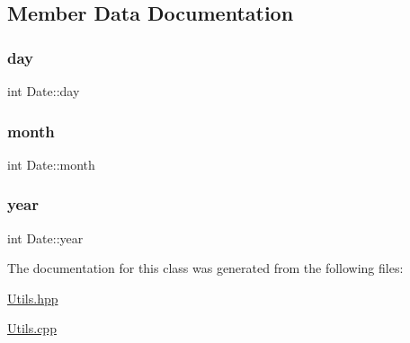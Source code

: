 \subsection{Member Data Documentation}
\hypertarget{class_date_a5b192adcabf2b2871e3f0b76c1ec1601}{}\label{class_date_a5b192adcabf2b2871e3f0b76c1ec1601} 
\subsubsection{\texorpdfstring{day}{day}}
{\footnotesize\ttfamily int Date\+::day\hspace{0.3cm}{\ttfamily [private]}}

\hypertarget{class_date_a533843e07c6ac8d19fee9b16f5336ba2}{}\label{class_date_a533843e07c6ac8d19fee9b16f5336ba2} 
\subsubsection{\texorpdfstring{month}{month}}
{\footnotesize\ttfamily int Date\+::month\hspace{0.3cm}{\ttfamily [private]}}

\hypertarget{class_date_a3eeced2ed56bc95d56782b9e738db8ea}{}\label{class_date_a3eeced2ed56bc95d56782b9e738db8ea} 
\subsubsection{\texorpdfstring{year}{year}}
{\footnotesize\ttfamily int Date\+::year\hspace{0.3cm}{\ttfamily [private]}}



The documentation for this class was generated from the following files\+:\begin{DoxyCompactItemize}
\item 
\hyperlink{_utils_8hpp}{Utils.\+hpp}\item 
\hyperlink{_utils_8cpp}{Utils.\+cpp}\end{DoxyCompactItemize}
